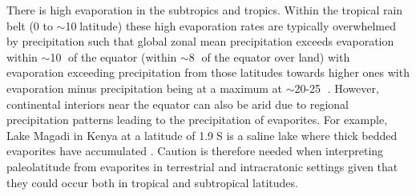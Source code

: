 \documentclass[11pt,letterpaper]{article}
\begin{document}
There is high evaporation in the subtropics and tropics. Within the tropical rain belt (0 to $\sim$10\textdegree$\;$latitude) these high evaporation rates are typically overwhelmed by precipitation such that global zonal mean precipitation exceeds evaporation within $\sim$10\textdegree$\;$ of the equator (within $\sim$8\textdegree$\;$ of the equator over land) with evaporation exceeding precipitation from those latitudes towards higher ones with evaporation minus precipitation being at a maximum at $\sim$20-25\textdegree$\;$ \citep{Park2020b}. However, continental interiors near the equator can also be arid due to regional precipitation patterns leading to the precipitation of evaporites. For example, Lake Magadi in Kenya at a latitude of 1.9\textdegree$\;$S is a saline lake where thick bedded evaporites have accumulated \citep{Eugster1980a}. Caution is therefore needed when interpreting paleolatitude from evaporites in terrestrial and intracratonic settings given that they could occur both in tropical and subtropical latitudes.
\end{document}
